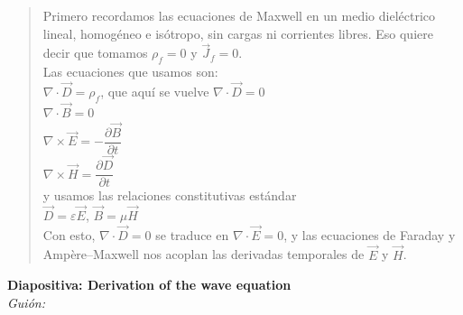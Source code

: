 \documentclass{article}
\begin{document}
\begin{quote}
Primero recordamos las \textcolor{Apple Green}{ecuaciones de Maxwell} en un medio dieléctrico lineal, 
homogéneo e isótropo, sin cargas ni corrientes libres. Eso quiere decir que tomamos 
\(\rho_f = 0\) y \(\vec{J}_f = 0\).\\[2mm]
Las ecuaciones que usamos son:\\[1mm]
\(\nabla\cdot\vec{D} = \rho_f\), \quad que aquí se vuelve \(\nabla\cdot\vec{D} = 0\)\\
\(\nabla\cdot\vec{B} = 0\)\\
\(\nabla\times\vec{E} = -\dfrac{\partial \vec{B}}{\partial t}\)\\
\(\nabla\times\vec{H} = \dfrac{\partial \vec{D}}{\partial t}\)\\[2mm]
y usamos las relaciones constitutivas estándar\\[1mm]
\(\vec{D} = \varepsilon \vec{E}\), \quad \(\vec{B} = \mu \vec{H}\)\\[2mm]
Con esto, \(\nabla\cdot\vec{D} = 0\) se traduce en \(\nabla\cdot\vec{E} = 0\), y las ecuaciones 
de Faraday y Ampère--Maxwell nos acoplan las derivadas temporales de \(\vec{E}\) y \(\vec{H}\).
\end{quote}

\vspace{0.4cm}

\noindent
\textbf{Diapositiva: Derivation of the wave equation}\\[2mm]
\textit{Guión:}\\[2mm]
\end{document}
